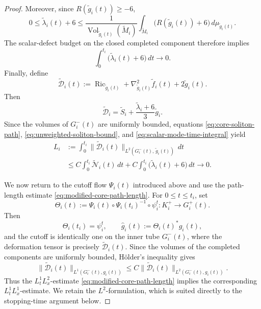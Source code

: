 \documentclass{amsart}
\begin{document}
\begin{proof}
\noindent Moreover, since \(R(\widetilde g_i(t))\geq-6\),
\[
        0\leq\widetilde\lambda_i(t)+6
        \leq
        \frac{1}
        {\operatorname{Vol}_{\widetilde g_i(t)}(\widetilde M_i)}
        \int_{\widetilde M_i}
        \bigl(R(\widetilde g_i(t))+6\bigr)
        \,d\mu_{\widetilde g_i(t)}.
\]
The scalar-defect budget on the closed completed component therefore
implies
\begin{equation}
\label{eq:scalar-mode-time-integral}
        \int_0^{t_i}
        \bigl(\widetilde\lambda_i(t)+6\bigr)\,dt
        \longrightarrow0.
\end{equation}
Finally, define
\[
        \widetilde{\mathcal D}_i(t)
        :=
        \operatorname{Ric}_{\widetilde g_i(t)}
        +
        \nabla_{\widetilde g_i(t)}^2\widetilde f_i(t)
        +
        2\widetilde g_i(t).
\]
Then
\[
        \widetilde{\mathcal D}_i
        =
        \widetilde S_i
        +
        \frac{\widetilde\lambda_i+6}{3}
        \widetilde g_i.
\]
Since
the volumes of \(G_i^-(t)\) are uniformly bounded, equations
\eqref{eq:core-soliton-path},
\eqref{eq:unweighted-soliton-bound}, and
\eqref{eq:scalar-mode-time-integral} yield
\begin{equation}
\label{eq:modified-core-path-length}
\begin{aligned}
        L_i
        &:=
        \int_0^{t_i}
        \|\widetilde{\mathcal D}_i(t)\|
        _{L^2(G_i^-(t),\,\widetilde g_i(t))}
        \,dt                                                    \\
        &\leq
        C\int_0^{t_i}
        \widetilde{\mathcal N}_i(t)\,dt
        +
        C\int_0^{t_i}
        \bigl(\widetilde\lambda_i(t)+6\bigr)\,dt
        \longrightarrow0.
\end{aligned}
\end{equation}

\noindent
We now return to the cutoff flow \(\Psi_i(t)\) introduced above and
use the path-length estimate \eqref{eq:modified-core-path-length}.
For \(0\leq t\leq t_i\), set
\[
        \Theta_i(t)
        :=
        \Psi_i(t)\circ\Psi_i(t_i)^{-1}\circ\psi_i^t
        :
        K_i^+\longrightarrow G_i^+(t).
\]
Then
\[
        \Theta_i(t_i)=\psi_i^t,
        \qquad
        \widehat g_i(t):=\Theta_i(t)^*g_i(t),
\]
and the cutoff is identically one on the inner tube \(G_i^-(t)\), where
the deformation tensor is precisely
\(\widetilde{\mathcal D}_i(t)\). \noindent
Since the volumes of the completed components are uniformly bounded,
Hölder's inequality gives
\[
        \|\widetilde{\mathcal D}_i(t)\|
        _{L^1(G_i^-(t),g_i(t))}
        \leq
        C\|\widetilde{\mathcal D}_i(t)\|
        _{L^2(G_i^-(t),g_i(t))}.
\]
Thus the \(L_t^1L_x^2\)-estimate
\eqref{eq:modified-core-path-length} implies the corresponding
\(L_t^1L_x^1\)-estimate. We retain the \(L^2\)-formulation, which is
suited directly to the stopping-time argument below.


\end{proof}
\end{document}
